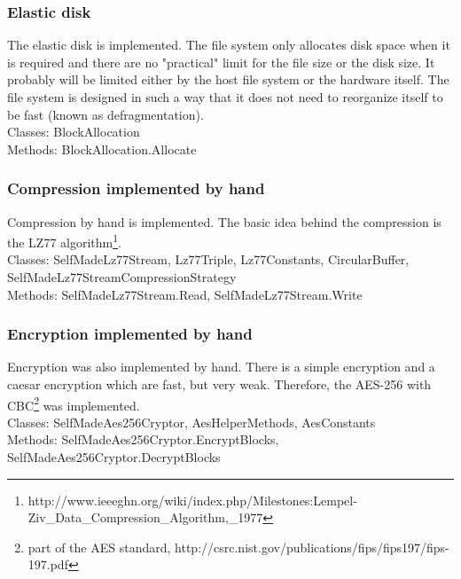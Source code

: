 \documentclass[JCDReport.tex]{subfiles}
\begin{document}
\subsubsection{Elastic disk}
The elastic disk is implemented. The file system only allocates disk space when it is required and there are no "practical" limit for the file size or the disk size. It probably will be limited either by the host file system or the hardware itself. The file system is designed in such a way that it does not need to reorganize itself to be fast (known as defragmentation).\\
Classes: BlockAllocation\\
Methods: BlockAllocation.Allocate

\subsubsection{Compression implemented by hand}
Compression by hand is implemented. The basic idea behind the compression is the LZ77 algorithm\footnote{http://www.ieeeghn.org/wiki/index.php/Milestones:Lempel-Ziv\_Data\_Compression\_Algorithm,\_1977}.\\
Classes: SelfMadeLz77Stream, Lz77Triple, Lz77Constants, CircularBuffer, SelfMadeLz77StreamCompressionStrategy\\
Methods: SelfMadeLz77Stream.Read, SelfMadeLz77Stream.Write

\subsubsection{Encryption implemented by hand}
Encryption was also implemented by hand. There is a simple encryption and a caesar encryption which are fast, but very weak. Therefore, the AES-256 with CBC\footnote{part of the AES standard, http://csrc.nist.gov/publications/fips/fips197/fips-197.pdf} was implemented.\\
Classes: SelfMadeAes256Cryptor, AesHelperMethods, AesConstants\\
Methods: SelfMadeAes256Cryptor.EncryptBlocks, SelfMadeAes256Cryptor.DecryptBlocks\\


\end{document}
